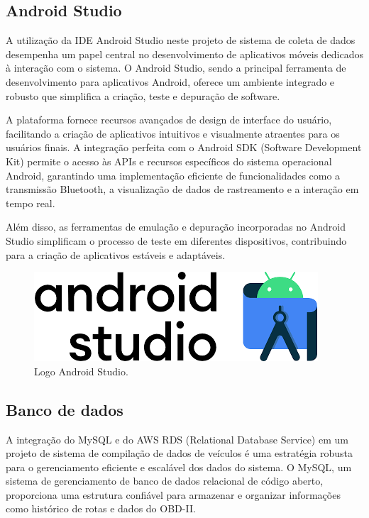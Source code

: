     \subsection{Android Studio} A utilização da IDE Android Studio neste projeto de sistema de coleta de dados desempenha um papel central no desenvolvimento de aplicativos móveis dedicados à interação com o sistema. O Android Studio, sendo a principal ferramenta de desenvolvimento para aplicativos Android, oferece um ambiente integrado e robusto que simplifica a criação, teste e depuração de software. 
    
    A plataforma fornece recursos avançados de design de interface do usuário, facilitando a criação de aplicativos intuitivos e visualmente atraentes para os usuários finais. A integração perfeita com o Android SDK (Software Development Kit) permite o acesso às APIs e recursos específicos do sistema operacional Android, garantindo uma implementação eficiente de funcionalidades como a transmissão Bluetooth, a visualização de dados de rastreamento e a interação em tempo real. 
    
    Além disso, as ferramentas de emulação e depuração incorporadas no Android Studio simplificam o processo de teste em diferentes dispositivos, contribuindo para a criação de aplicativos estáveis e adaptáveis.

     \begin{figure}[hp]
    \centering
    
    \includegraphics[scale=0.4]{figures/logo_android.png}
    
    \caption{Logo Android Studio.}
    
\end{figure}
    
     \subsection{Banco de dados} A integração do MySQL e do AWS RDS (Relational Database Service) em um projeto de sistema de compilação de dados de veículos é uma estratégia robusta para o gerenciamento eficiente e escalável dos dados do sistema. O MySQL, um sistema de gerenciamento de banco de dados relacional de código aberto, proporciona uma estrutura confiável para armazenar e organizar informações como histórico de rotas e dados do OBD-II. 
     

